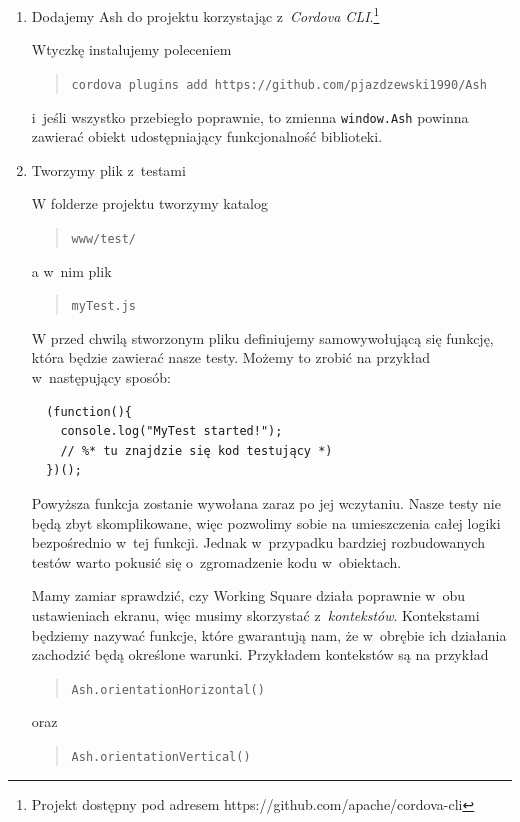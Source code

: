 \documentclass[brudnopis]{xmgr}
\begin{document}
\begin{enumerate}
  \item Dodajemy Ash do projektu korzystając z~\textit{Cordova CLI}.\footnote{Projekt dostępny pod adresem https://github.com/apache/cordova-cli}

Wtyczkę instalujemy poleceniem 
\begin{quote}
   \texttt{cordova plugins add https://github.com/pjazdzewski1990/Ash}
\end{quote}
i~jeśli wszystko przebiegło poprawnie, to zmienna \texttt{window.Ash} powinna zawierać obiekt udostępniający funkcjonalność biblioteki.  

 \item Tworzymy plik z~testami

W folderze projektu tworzymy katalog 
\begin{quote}
  \texttt{www/test/}
\end{quote} 
a w~nim plik 
\begin{quote}
  \texttt{myTest.js}
\end{quote} 
W przed chwilą stworzonym pliku definiujemy samowywołującą się funkcję, która będzie zawierać nasze testy. Możemy  to zrobić na przykład w~następujący sposób:

 \begin{lstlisting}
  (function(){
	console.log("MyTest started!");
	// %* tu znajdzie się kod testujący *)
  })();
\end{lstlisting}

Powyższa funkcja zostanie wywołana zaraz po jej wczytaniu. Nasze testy nie będą zbyt skomplikowane, więc pozwolimy sobie na umieszczenia całej logiki bezpośrednio w~tej funkcji. Jednak w~przypadku bardziej rozbudowanych testów warto pokusić się o~zgromadzenie kodu w~obiektach.

Mamy zamiar sprawdzić, czy Working Square działa poprawnie w~obu ustawieniach ekranu, więc musimy skorzystać z~\textit{kontekstów}. Kontekstami będziemy nazywać funkcje, które gwarantują nam, że w~obrębie ich działania zachodzić będą określone warunki. Przykładem kontekstów są na przykład

\begin{quote}
   \texttt{Ash.orientationHorizontal()}
\end{quote}

oraz 

\begin{quote}
   \texttt{Ash.orientationVertical()}
\end{quote}


\end{enumerate}
\end{document}
